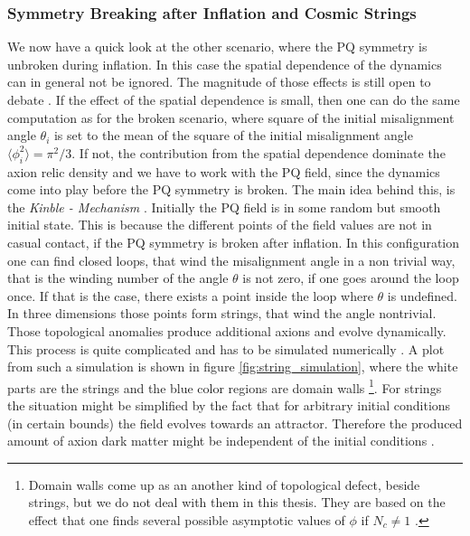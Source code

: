 \documentclass[twoside,a4paper, 12pt]{article}
\numberwithin{equation}{section}
\begin{document}
\subsubsection{Symmetry Breaking after Inflation and Cosmic Strings}
\label{sec:cosmic_strings}
We now have a quick look at the other scenario, where the PQ symmetry is unbroken
during inflation. In this case the spatial dependence of the dynamics can in general not be ignored.
The magnitude of those effects is still open to debate \cite{GorghettoAttractivStrings}.
If the effect of the spatial dependence is small, then one can do the same
computation as for the broken scenario, where square of the initial misalignment angle
$\theta_i$ is set to the mean of the square of the initial misalignment angle $\langle \phi_i^2 \rangle = \pi^2 / 3$.
If not, the contribution from the spatial dependence dominate the
axion relic density and we have to work with the PQ field, since the
dynamics come into play before the PQ symmetry is broken.
The main idea behind this, is the \emph{Kinble - Mechanism} \cite{Kibble:1976sj}.
Initially the PQ field is in some random but smooth initial state.
This is because the different points of the field values are
not in casual contact, if the PQ symmetry is broken after inflation.
In this configuration one can find closed loops, that wind the misalignment angle
in a non trivial way, that is the winding number of the angle $\theta$ is
not zero, if one goes around the loop once.
If that is the case, there exists a point inside the loop where $\theta$ is undefined.
In three dimensions those points form strings, that wind the angle nontrivial.
Those topological anomalies produce additional axions and
evolve dynamically.
This process is quite complicated and has to be simulated numerically \cite{GorghettoAttractivStrings}
\cite{StringFits}. A plot from such a simulation \cite{StringFits} is shown in figure \ref{fig:string_simulation}, where the white parts are the strings and the blue color regions are domain walls \footnote{Domain walls come up as an another kind
of topological defect, beside strings,
but we do not deal with them in this thesis. They are based on the effect that one finds several possible asymptotic values of $\phi$ if $N_c \neq 1$ \cite[Sec. 2.2, Sec. 3.3.2]{MarshAxionCosmo}.
}.
For strings the situation might be simplified by the fact that for arbitrary initial conditions (in certain bounds)
the field evolves towards an attractor. Therefore the produced amount of axion dark matter might be independent
of the initial conditions \cite{GorghettoAttractivStrings}.
\end{document}
